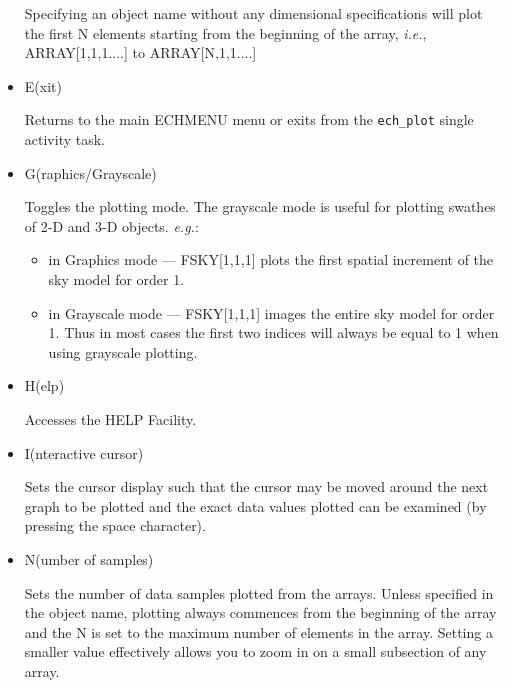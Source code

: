 \begin{itemize}
     Specifying an object name without any dimensional specifications will
     plot the first N elements starting from the beginning of the array,
     {\it{i.e.}}, ARRAY[1,1,1....] to ARRAY[N,1,1....]

\item {\sunspec{\Large\tt}{\bf} E}(xit)

     Returns to the main ECHMENU menu or exits from
     the \verb+ech_plot+ single activity task.

\item {\sunspec{\Large\tt}{\bf} G}(raphics/Grayscale)

     Toggles the plotting mode. The
     grayscale mode is useful for plotting swathes of 2-D and 3-D objects.
     {\it{e.g.}}:

     \begin{itemize}

     \item in Graphics mode --- FSKY[1,1,1] plots the first spatial
            increment of the sky model for order 1.

     \item in Grayscale mode --- FSKY[1,1,1] images the entire sky model
            for order 1.  Thus in most cases the first two indices will
            always be equal to 1 when using grayscale plotting.

     \end{itemize}

\item {\sunspec{\Large\tt}{\bf} H}(elp)

     Accesses the HELP Facility.

\item {\sunspec{\Large\tt}{\bf} I}(nteractive cursor)

     Sets the cursor display such that
     the cursor may be moved around the next graph to be plotted and the
     exact data values plotted can be examined (by pressing the space
     character).

\item {\sunspec{\Large\tt}{\bf} N}(umber of samples)

     Sets the number of data samples plotted from the arrays.
     Unless specified in the object name,
     plotting always commences from the beginning of the array and the N
     is set to the maximum number of elements in the array. Setting a
     smaller value effectively allows you to zoom in on a small subsection
     of any array.


\end{itemize}
